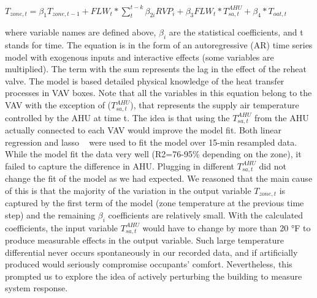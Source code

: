 $T_{zone,t} = \beta_1 T_{zone,t-1} + {FLW}_t * \sum\limits_{t}^{t-k} \beta_{2i}{RVP}_i + \beta_3 {FLW}_t * T_{sa,t}^{AHU} + \beta_4 * T_{oat,t}$

where variable names are defined above, $\beta_i$ are the statistical coefficients, and t stands for time. The equation is in the form of an autoregressive (AR) time series model with exogenous inputs and interactive effects (some variables are multiplied). The term with the sum represents the lag in the effect of the reheat valve. The model is based detailed physical knowledge of the heat transfer processes in VAV boxes. Note that all the variables in this equation belong to the VAV with the exception of ($T_{sa,t}^{AHU}$), that represents the supply air temperature controlled by the AHU at time t. The idea is that using the $T_{sa,t}^{AHU}$ from the AHU actually connected to each VAV would improve the model fit. Both linear regression and lasso ~\cite{tibshirani1996regression} were used to fit the model over 15-min resampled data. While the model fit the data very well (R2=76-95\% depending on the zone), it failed to capture the difference in AHU. Plugging in different $T_{sa,t}^{AHU}$ did not change the fit of the model as we had expected. We reasoned that the main cause of this is that the majority of the variation in the output variable $T_{zone,t}$ is captured by the first term of the model (zone temperature at the previous time step) and the remaining $\beta_i$  coefficients are relatively small. With the calculated coefficients, the input variable $T_{sa,t}^{AHU}$ would have to change by more than 20 °F to produce measurable effects in the output variable. Such large temperature differential never occurs spontaneously in our recorded data, and if artificially produced would seriously compromise occupants’ comfort. Nevertheless, this prompted us to explore the idea of actively perturbing the building to measure system response.
